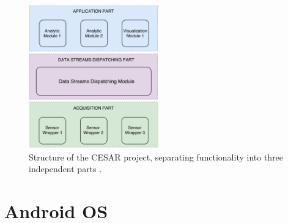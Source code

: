 \begin{figure}
    \centering
    \includegraphics[width=0.5\textwidth]{images/parts.png}
    \caption{Structure of the CESAR project, separating functionality into three independent parts \cite{daniel}.}
    \label{fig:parts}
\end{figure}






\section{Android OS}

